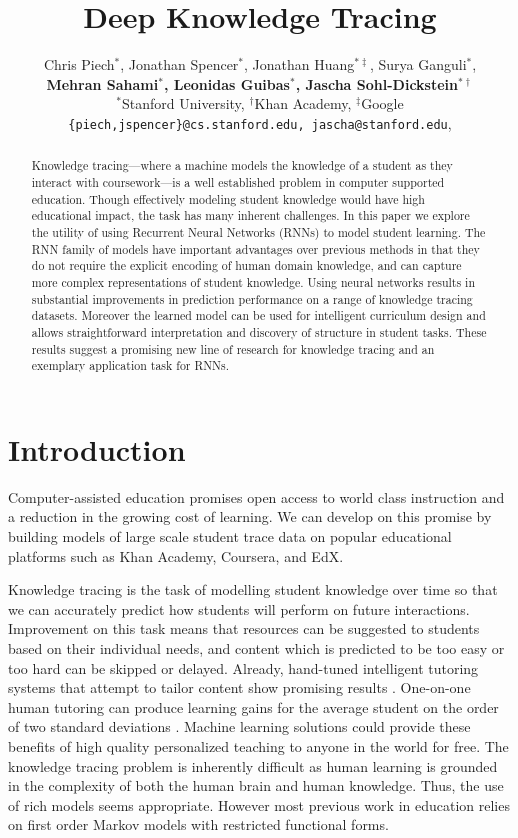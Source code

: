 \documentclass{article} \usepackage{nips,times}
\title{Deep Knowledge Tracing}
\author{
Chris Piech$^*$, Jonathan Spencer$^*$, Jonathan Huang$^{*\ddag}$, Surya Ganguli$^*$, \\ \textbf{
Mehran Sahami$^*$, Leonidas Guibas$^*$, Jascha Sohl-Dickstein$^{*\dag}$ } \\
$^*$Stanford University, $^\dag$Khan Academy, $^\ddag$Google \\
\texttt{\{piech,jspencer\}@cs.stanford.edu, jascha@stanford.edu},
}
\begin{document}
\maketitle

\vspace{-4mm}

\begin{abstract}
Knowledge tracing---where a machine models the knowledge of a student as they interact with coursework---is a well established problem in computer supported education. Though effectively modeling student knowledge would have high educational impact, the task has many inherent challenges. In this paper we explore the utility of using Recurrent Neural Networks (RNNs) to model student learning. The RNN family of models have important advantages over previous methods in that they do not require the explicit encoding of human domain knowledge, and can capture more complex representations of student knowledge. Using neural networks results in substantial improvements in prediction performance on a range of knowledge tracing datasets. Moreover the learned model can be used for intelligent curriculum design and allows straightforward interpretation and discovery of structure in student tasks. These results suggest a promising new line of research for knowledge tracing and an exemplary application task for RNNs.
\end{abstract}

\section{Introduction}


Computer-assisted education promises open access to world class instruction and a reduction in the growing cost of learning.
We can develop on this promise by building models of large scale student trace data on popular educational platforms such as Khan Academy, Coursera, and EdX.





Knowledge tracing is the task of modelling student knowledge over time so that we can accurately predict how students will perform on future interactions.  Improvement on this task means that resources can be suggested to students based on their individual needs, and content which is predicted to be too easy or too hard
can be skipped or delayed. Already, hand-tuned intelligent tutoring systems that attempt to tailor content show promising results \cite{polson2013foundations}. One-on-one human tutoring 
can produce learning gains for the average student on the order of two standard deviations \cite{corbett2001cognitive}.
Machine learning solutions could provide these benefits of 
high quality personalized teaching to anyone in the world for free. The knowledge tracing problem is inherently difficult as human learning is grounded in the complexity of both the human brain and human knowledge.
Thus, the use of rich models seems appropriate.
However most previous work in education relies on first order Markov models with restricted functional forms.
\end{document}
